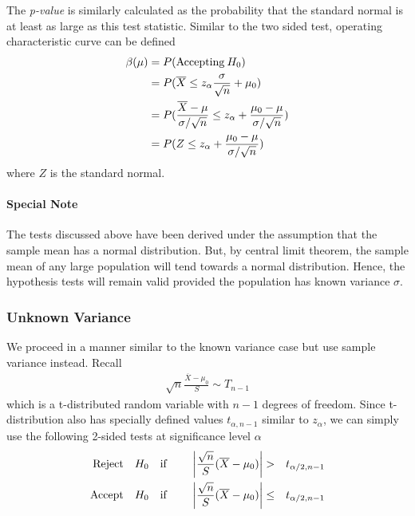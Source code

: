 \documentclass[../probability-notes.tex]{subfiles}
\begin{document}
    The \emph{p-value} is similarly calculated as the probability that the standard normal is at least as large as this test statistic. Similar to the two sided test, operating characteristic curve can be defined
    \begin{align*}
        \beta(\mu) &= P(\text{Accepting\:} H_{0})\\
        &= P(\overline{X} \leq z_{\alpha}\frac{\sigma}{\sqrt{n}} + \mu_{0})\\
        &= P(\frac{\overline{X} - \mu}{\sigma/\sqrt{n}} \leq z_{\alpha} + \frac{\mu_{0} - \mu}{\sigma/\sqrt{n}})\\
        &= P(Z \leq z_{\alpha} + \frac{\mu_{0} - \mu}{\sigma/\sqrt{n}})
    \end{align*}
    where $Z$ is the standard normal.\newline

    \paragraph{Special Note} The tests discussed above have been derived under the assumption that the sample mean has a normal distribution. But, by central limit theorem, the sample mean of any large population will tend towards a normal distribution. Hence, the hypothesis tests will remain valid provided the population has known variance $\sigma$.

    \subsubsection{Unknown Variance}\label{mean_normal_unknown_variance}
    We proceed in a manner similar to the known variance case but use sample variance instead. Recall
    \begin{align*}
        \sqrt{n} \frac{\overline{X} - \mu_{0}}{S} \sim T_{n-1}
    \end{align*}
    which is a t-distributed random variable with $n-1$ degrees of freedom. Since t-distribution also has specially defined values $t_{\alpha, n-1}$ similar to $z_{\alpha}$, we can simply use the following 2-sided tests at significance level $\alpha$
    \begin{alignat*}{4}
        \text{Reject\quad} &H_{0} \text{\quad if \quad} &\bigg \lvert\frac{\sqrt{n}}{S}(\overline{X} - \mu_{0}) \bigg\rvert &> &t_{\alpha/2, n-1}\\
        \text{Accept\quad} &H_{0} \text{\quad if\quad} &\bigg \lvert\frac{\sqrt{n}}{S}(\overline{X} - \mu_{0}) \bigg\rvert &\leq &t_{\alpha/2, n-1}\\
    \end{alignat*}
\end{document}
